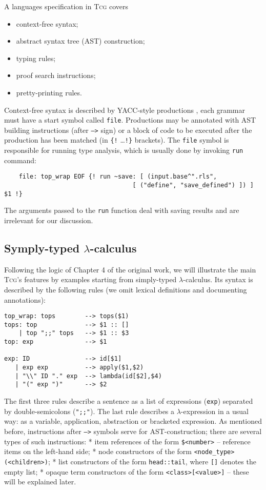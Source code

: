 \documentclass[a4paper,12pt]{article}
\newcommand{\Tcg}{\textsc{Tcg}}
\newcommand{\code}[1]{\texttt{#1}}
\begin{document}
A languages specification in \Tcg{} covers 
\begin{itemize}
	\item context-free syntax;
	\item abstract syntax tree (AST) construction;
	\item typing rules;
	\item proof search instructions;
	\item pretty-printing rules.
\end{itemize}

Context-free syntax is described by YACC-style productions \cite{YACC}, each grammar must have a start symbol called \code{file}. Productions may be annotated with AST building instructions (after \code{-->} sign) or a block of code to be executed after the production has been matched (in \code{\{!} \ldots \code{!\}} brackets). The \code{file} symbol is responsible for running type analysis, which is usually done by invoking \code{run} command:

\begin{verbatim}
	file: top_wrap EOF {! run ~save: [ (input.base^".rls",
	                               [ ("define", "save_defined") ]) ] $1 !}
\end{verbatim}

The arguments passed to the \code{run} function deal with saving results and are irrelevant for our discussion.

\subsection{Symply-typed $\lambda$-calculus}

Following the logic of Chapter 4 of the original work, we will illustrate the main \Tcg{}'s features by examples starting from simply-typed $\lambda$-calculus. Its syntax is described by the following rules (we omit lexical definitions and documenting annotations):

\begin{verbatim}
top_wrap: tops        --> tops($1)
tops: top             --> $1 :: []
    | top ";;" tops   --> $1 :: $3
top: exp              --> $1

exp: ID               --> id[$1]
   | exp exp          --> apply($1,$2)
   | "\\" ID "." exp  --> lambda(id[$2],$4)
   | "(" exp ")"      --> $2
\end{verbatim}

The first three rules describe a sentence as a list of expressions (\code{exp}) separated by double-semicolons (\code{";;"}). The last rule describes a $\lambda$-expression in a usual way: as a variable, application, abstraction or bracketed expression. As mentioned before, instructions after \code{-->} symbols serve for AST-construction; there are several types of such instructions:
 * item references of the form \code{\$<number>} -- reference items on the left-hand side;
 * node constructors of the form \code{<node_type>(<children>)};
 * list constructors of the form \code{head::tail}, where \code{[]} denotes the empty list;
 * opaque term constructors of the form \code{<class>[<value>]} -- these will be explained later.
\end{document}
